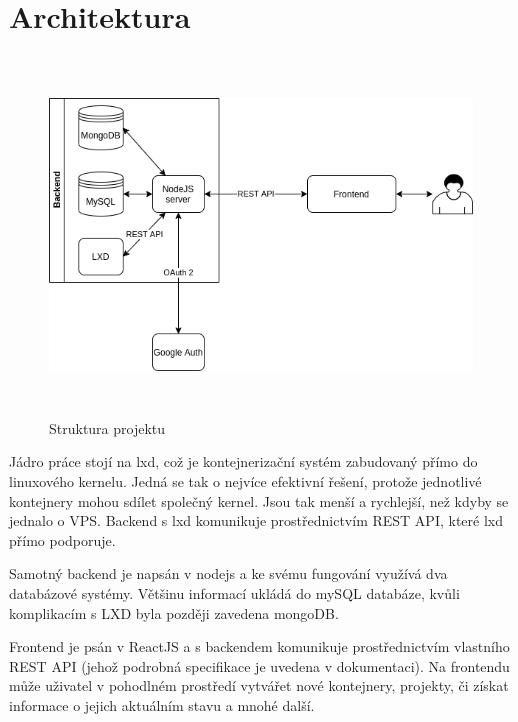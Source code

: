 \documentclass[a4paper,oneside,12pt]{report}
\begin{document}


\tableofcontents


\newpage



\setcounter{page}{1}

\chapter{Architektura}

\begin{figure}[h]
	\centering
	\includegraphics[height=9.5cm]{../img/architecture.png}
	\caption[Strukura projektu, vlastní tvorba]{Struktura projektu}
	\label{fig:architecture}
\end{figure}

Jádro práce stojí na lxd, což je kontejnerizační systém zabudovaný přímo do linuxového kernelu.
Jedná se tak o nejvíce efektivní řešení, protože jednotlivé kontejnery mohou sdílet společný kernel.
Jsou tak menší a rychlejší, než kdyby se jednalo o VPS.
Backend s lxd komunikuje prostřednictvím REST API, které lxd přímo podporuje.

Samotný backend je napsán v nodejs a ke svému fungování využívá dva databázové systémy.
Většinu informací ukládá do mySQL databáze, kvůli komplikacím s LXD byla později zavedena mongoDB.

Frontend je psán v ReactJS a s backendem komunikuje prostřednictvím vlastního REST API (jehož podrobná specifikace je uvedena v dokumentaci).
Na frontendu může uživatel v pohodlném prostředí vytvářet nové kontejnery, projekty, či získat informace o jejich aktuálním stavu a mnohé další.
\end{document}
